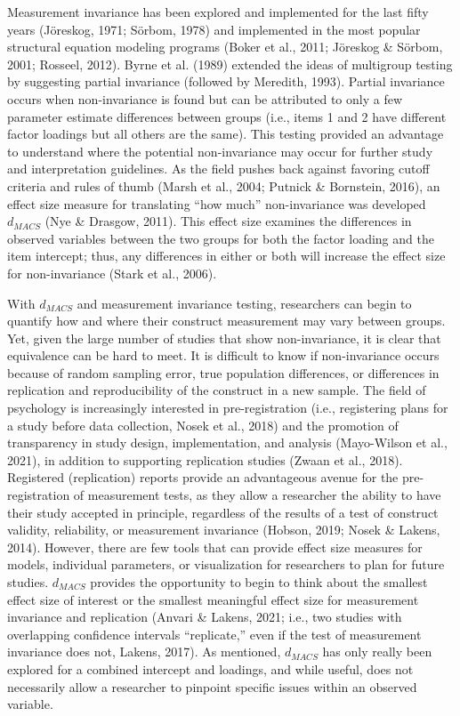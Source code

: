 \documentclass[
  man]{apa7}
\begin{document}
Measurement invariance has been explored and implemented for the last fifty years (Jöreskog, 1971; Sörbom, 1978) and implemented in the most popular structural equation modeling programs (Boker et al., 2011; Jöreskog \& Sörbom, 2001; Rosseel, 2012). Byrne et al. (1989) extended the ideas of multigroup testing by suggesting partial invariance (followed by Meredith, 1993). Partial invariance occurs when non-invariance is found but can be attributed to only a few parameter estimate differences between groups (i.e., items 1 and 2 have different factor loadings but all others are the same). This testing provided an advantage to understand where the potential non-invariance may occur for further study and interpretation guidelines. As the field pushes back against favoring cutoff criteria and rules of thumb (Marsh et al., 2004; Putnick \& Bornstein, 2016), an effect size measure for translating ``how much'' non-invariance was developed \(d_{MACS}\) (Nye \& Drasgow, 2011). This effect size examines the differences in observed variables between the two groups for both the factor loading and the item intercept; thus, any differences in either or both will increase the effect size for non-invariance (Stark et al., 2006).

With \(d_{MACS}\) and measurement invariance testing, researchers can begin to quantify how and where their construct measurement may vary between groups. Yet, given the large number of studies that show non-invariance, it is clear that equivalence can be hard to meet. It is difficult to know if non-invariance occurs because of random sampling error, true population differences, or differences in replication and reproducibility of the construct in a new sample. The field of psychology is increasingly interested in pre-registration (i.e., registering plans for a study before data collection, Nosek et al., 2018) and the promotion of transparency in study design, implementation, and analysis (Mayo-Wilson et al., 2021), in addition to supporting replication studies (Zwaan et al., 2018). Registered (replication) reports provide an advantageous avenue for the pre-registration of measurement tests, as they allow a researcher the ability to have their study accepted in principle, regardless of the results of a test of construct validity, reliability, or measurement invariance (Hobson, 2019; Nosek \& Lakens, 2014). However, there are few tools that can provide effect size measures for models, individual parameters, or visualization for researchers to plan for future studies. \(d_{MACS}\) provides the opportunity to begin to think about the smallest effect size of interest or the smallest meaningful effect size for measurement invariance and replication (Anvari \& Lakens, 2021; i.e., two studies with overlapping confidence intervals ``replicate,'' even if the test of measurement invariance does not, Lakens, 2017). As mentioned, \(d_{MACS}\) has only really been explored for a combined intercept and loadings, and while useful, does not necessarily allow a researcher to pinpoint specific issues within an observed variable.
\end{document}
